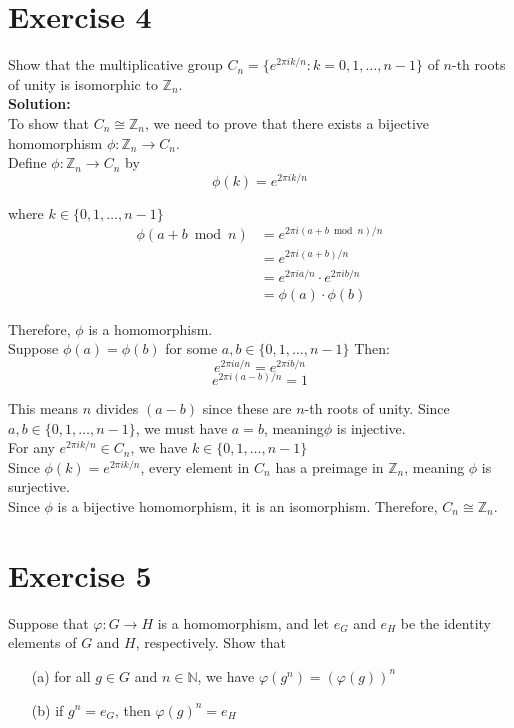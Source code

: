 \documentclass{article}
\begin{document}
\newpage

\section*{Exercise 4}
Show that the multiplicative group $C_n = \{e^{2\pi i k/n} : k = 0,1,\ldots,n-1\}$ of $n$-th roots of unity is isomorphic to $\mathbb{Z}_n$. \\

\textbf{Solution:} \\

To show that $C_n \cong \mathbb{Z}_n$, we need to prove that there exists a bijective homomorphism $\phi: \mathbb{Z}_n \to C_n$. \\

Define $\phi: \mathbb{Z}_n \to C_n$ by
\[\phi(k) = e^{2\pi i k/n}\]

where $k \in \{0,1,\ldots,n-1\}$ \\

\begin{align*}
\phi(a + b \bmod n) &= e^{2\pi i(a + b \bmod n)/n} \\
&= e^{2\pi i(a + b)/n} \\
&= e^{2\pi ia/n} \cdot e^{2\pi ib/n} \\
&= \phi(a) \cdot \phi(b)
\end{align*}

Therefore, $\phi$ is a homomorphism. \\

Suppose $\phi(a) = \phi(b)$ for some $a,b \in \{0,1,\ldots,n-1\}$
Then:
\[e^{2\pi ia/n} = e^{2\pi ib/n}\]
\[e^{2\pi i(a-b)/n} = 1\]

This means $n$ divides $(a-b)$ since these are $n$-th roots of unity.
Since $a,b \in \{0,1,\ldots,n-1\}$, we must have $a = b$, meaning$\phi$ is injective. \\

For any $e^{2\pi ik/n} \in C_n$, we have $k \in \{0,1,\ldots,n-1\}$ \\

Since $\phi(k) = e^{2\pi ik/n}$, every element in $C_n$ has a preimage in $\mathbb{Z}_n$, meaning $\phi$ is surjective. \\

Since $\phi$ is a bijective homomorphism, it is an isomorphism. Therefore, $C_n \cong \mathbb{Z}_n$.
\newpage

\section*{Exercise 5}
Suppose that $\varphi: G \to H$ is a homomorphism, and let $e_G$ and $e_H$ be the identity elements of $G$ and $H$, respectively. Show that
\begin{itemize}
\item[(a)] for all $g \in G$ and $n \in \mathbb{N}$, we have $\varphi(g^n) = (\varphi(g))^n$
\item[(b)] if $g^n = e_G$, then $\varphi(g)^n = e_H$
\end{itemize}
\end{document}
